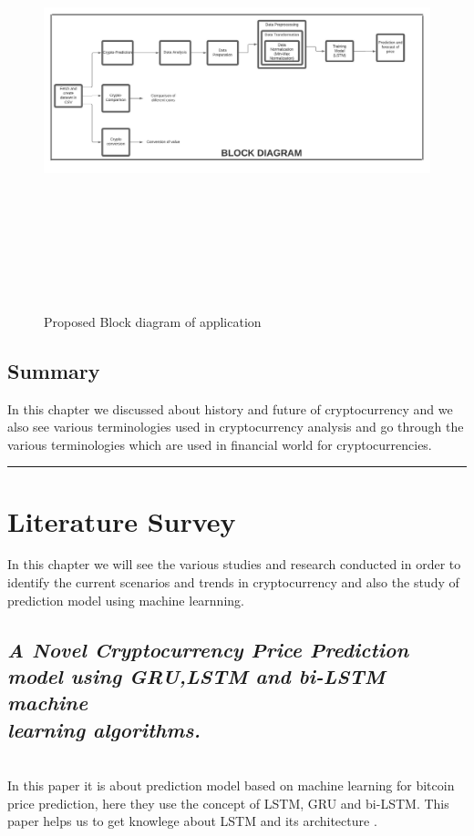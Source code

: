 \documentclass[openany,12pt]{report}
\begin{document}
\\
\\
\begin{figure}[H]
\centering
\includegraphics[width=6in,height=5in]{./Block diagram.jpeg}
\caption{Proposed Block diagram of application}
\end{figure}


\section{Summary}
In this chapter we discussed about history and future of cryptocurrency and we also see various terminologies used in cryptocurrency analysis and go through the various terminologies which are used in financial world for cryptocurrencies.  
\vfill
\hrule
\chapter{Literature Survey}
In this chapter we will see the various studies and research conducted in order to identify the current scenarios and trends in cryptocurrency and also the study of prediction model using machine learnning.
\section{{\textit{A Novel Cryptocurrency Price Prediction \\model using GRU,LSTM and bi-LSTM machine \\learning algorithms.}}}
\\In this paper it is about prediction model based on machine learning for bitcoin price prediction, here they use the concept of LSTM, GRU and bi-LSTM.
This paper helps us to get knowlege about LSTM and its architecture \cite{paper1}.\\
\end{document}
